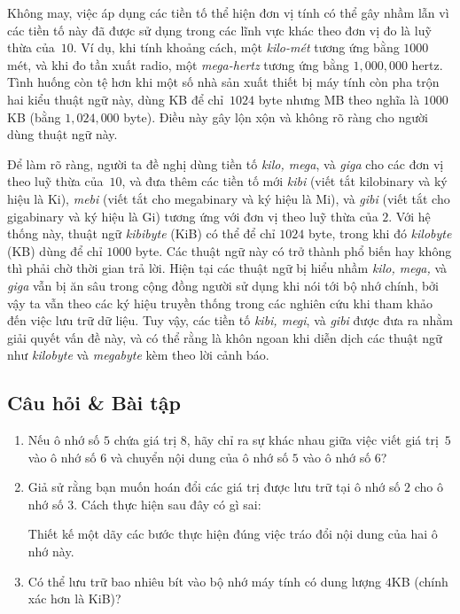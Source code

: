 Không may, việc áp dụng các tiền tố thể hiện đơn vị tính có thể gây nhầm lẫn vì các tiền
tố này đã được sử dụng trong các lĩnh vực khác theo đơn vị đo là luỹ thừa của~$10$. Ví dụ,
khi tính khoảng cách, một \textit{kilo-mét} tương ứng bằng $1000$ mét, và khi đo tần xuất
radio, một \textit{mega-hertz} tương ứng bằng $1,000,000$ hertz. Tình huống còn tệ hơn khi
một số nhà sản xuất thiết bị máy tính còn pha trộn hai kiểu thuật ngữ này, dùng KB để
chỉ~$1024$ byte nhưng MB theo nghĩa là $1000$KB (bằng $1,024,000$ byte). Điều này gây lộn
xộn và không rõ ràng cho người dùng thuật ngữ này.

Để làm rõ ràng, người ta đề nghị dùng tiền tố \textit{kilo, mega}, và \textit{giga} cho
các đơn vị theo luỹ thừa của~$10$, và đưa thêm các tiền tố mới \textit{kibi} (viết tắt
kilobinary và ký hiệu là Ki), \textit{mebi} (viết tắt cho megabinary và ký hiệu là Mi), và
\textit{gibi} (viết tắt cho gigabinary và ký hiệu là Gi) tương ứng với đơn vị theo luỹ
thừa của $2$. Với hệ thống này, thuật ngữ \textit{kibibyte} (KiB) có thể để chỉ $1024$
byte, trong khi đó \textit{kilobyte} (KB) dùng để chỉ $1000$ byte. Các thuật ngữ này có
trở thành phổ biến hay không thì phải chờ thời gian trả lời. Hiện tại các thuật ngữ bị
hiểu nhầm \textit{kilo, mega,} và \textit{giga} vẫn bị ăn sâu trong cộng đồng người sử
dụng khi nói tới bộ nhớ chính, bởi vậy ta vẫn theo các ký hiệu truyền thống trong các
nghiên cứu khi tham khảo đến việc lưu trữ dữ liệu. Tuy vậy, các tiền tố \textit{kibi,
  megi}, và \textit{gibi} được đưa ra nhằm giải quyết vấn đề này, và có thể rằng là khôn
ngoan khi diễn dịch các thuật ngữ như \textit{kilobyte} và \textit{megabyte} kèm theo lời
cảnh báo.

\subsection*{Câu hỏi \& Bài tập}
\begin{enumerate}
\item Nếu ô nhớ số $5$ chứa giá trị $8$, hãy chỉ ra sự khác nhau giữa việc viết
  giá trị~$5$ vào ô nhớ số $6$ và chuyển nội dung của ô nhớ số $5$ vào ô nhớ số $6$?

\item Giả sử rằng bạn muốn hoán đổi các giá trị được lưu trữ tại ô nhớ số $2$ cho ô nhớ số
  $3$. Cách thực hiện sau đây có gì sai:
  Thiết kế một dãy các bước thực hiện đúng việc tráo đổi nội dung của hai ô nhớ này.

\item Có thể lưu trữ bao nhiêu bít vào bộ nhớ máy tính có dung lượng $4$KB (chính xác hơn
  là KiB)?
  
\end{enumerate}
